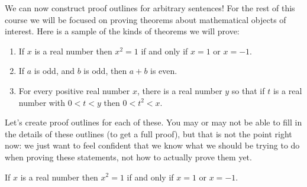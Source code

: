 We can now construct proof outlines for arbitrary sentences!  For the rest of this course we will be focused on proving theorems about mathematical objects of interest.  Here is a sample of the kinds of theorems we will prove:

\begin{enumerate}
		\item 	If $x$ is a real number then $x^2 = 1$ if and only if $x=1$ or $x=-1$.
		\item If $a$ is odd, and $b$ is odd, then $a+b$ is even.
		\item 	For every positive real number $x$, there is a real number $y$ so that if $t$ is a real number with $0<t<y$ then $0<t^2<x$.
\end{enumerate}


Let's create proof outlines for each of these.  You may or may not be able to fill in the details of these outlines (to get a full proof), but that is not the point right now:  we just want to feel confident that we know what we should be trying to do when proving these statements, not how to actually prove them yet.

\medskip

\begin{theorem}
		If $x$ is a real number then $x^2 = 1$ if and only if $x=1$ or $x=-1$.
	\end{theorem}

